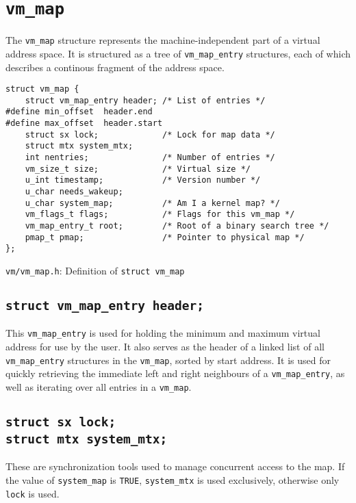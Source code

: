 \documentclass[shortabstract, english]{iithesis}
\begin{document}
\section{\texttt{vm_map}}

The \texttt{vm_map} structure represents the machine-independent part of a
virtual address space. It is structured as a tree of \texttt{vm_map_entry}
structures, each of which describes a continous fragment of the address space.


\begin{listing}[H]
\begin{verbatim}
struct vm_map {
    struct vm_map_entry header; /* List of entries */
#define min_offset  header.end
#define max_offset  header.start
    struct sx lock;             /* Lock for map data */
    struct mtx system_mtx;
    int nentries;               /* Number of entries */
    vm_size_t size;             /* Virtual size */
    u_int timestamp;            /* Version number */
    u_char needs_wakeup;
    u_char system_map;          /* Am I a kernel map? */
    vm_flags_t flags;           /* Flags for this vm_map */
    vm_map_entry_t root;        /* Root of a binary search tree */
    pmap_t pmap;                /* Pointer to physical map */
};
\end{verbatim}
\caption{\texttt{vm/vm\_map.h}: Definition of \texttt{struct vm_map}}
\end{listing}

\subsection*{\texttt{struct vm_map_entry header;}}
This \texttt{vm_map_entry} is used for holding the minimum and maximum virtual
address for use by the user. It also serves as the header of a linked list of
all \texttt{vm_map_entry} structures in the \texttt{vm_map}, sorted by start
address. It is used for quickly retrieving the immediate left and right
neighbours of a \texttt{vm_map_entry}, as well as iterating over all entries
in a \texttt{vm_map}.

\subsection*{\texttt{struct sx lock;}\\
  \texttt{struct mtx system_mtx;}}
These are synchronization tools used to manage concurrent access to the map. If
the value of \texttt{system_map} is \texttt{TRUE}, \texttt{system_mtx} is used
exclusively, otherwise only \texttt{lock} is used.
\end{document}
